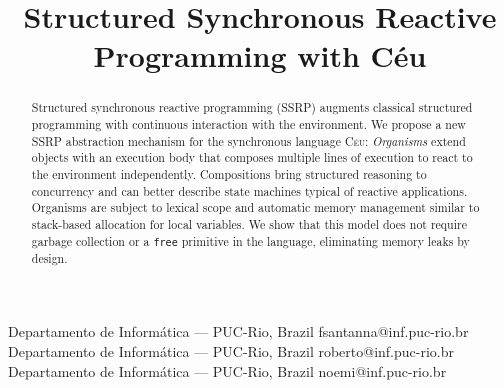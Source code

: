 \documentclass{sigplanconf}
\newcommand{\CEU}{\textsc{C\'{e}u}\xspace}
\newcommand{\code}[1] {{\small{\texttt{#1}}}}
\newcommand{\1}{\;}
\newcommand{\2}{\;\;}
\newcommand{\3}{\;\;\;}
\newcommand{\5}{\;\;\;\;\;}
\begin{document}
\sloppy

\setlength{\pdfpageheight}{\paperheight}
\setlength{\pdfpagewidth}{\paperwidth}


\title {
    Structured Synchronous Reactive Programming with C\'eu
}

           {Departamento de Inform\'atica --- PUC-Rio, Brazil}
           {fsantanna@inf.puc-rio.br}
           {Departamento de Inform\'atica --- PUC-Rio, Brazil}
           {roberto@inf.puc-rio.br}
           {Departamento de Inform\'atica --- PUC-Rio, Brazil}
           {noemi@inf.puc-rio.br}

\maketitle

\begin{abstract}
Structured synchronous reactive programming (SSRP) augments classical 
structured programming with continuous interaction with the environment.
%
We propose a new SSRP abstraction mechanism for the synchronous language \CEU:
%
\emph{Organisms} extend objects with an execution body that composes multiple 
lines of execution to react to the environment independently.
%
Compositions bring structured reasoning to concurrency and can better describe 
state machines typical of reactive applications.
%
Organisms are subject to lexical scope and automatic memory management similar 
to stack-based allocation for local variables.
We show that this model does not require garbage collection or a \code{free} 
primitive in the language, eliminating memory leaks by design.
\end{abstract}


\end{document}
